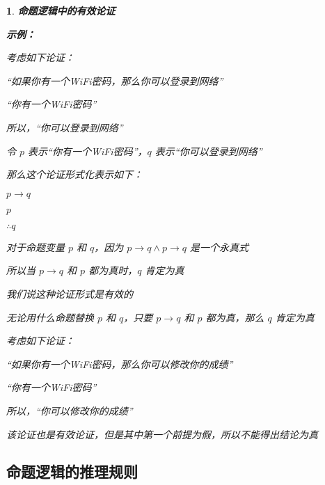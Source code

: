 \documentclass[UTF8]{report}
\theoremstyle{MyLineTheoremStyle} %
\theoremstyle{MyBlockTheoremStyle} %
\theoremstyle{MySubsubsectionStyle} %
\newtheorem{definition}{}
\begin{document}
\begin{definition}
    \textbf{命题逻辑中的有效论证}\par
    \vspace{1em} %
    \textbf{示例：}\par
    考虑如下论证：\par
    “如果你有一个WiFi密码，那么你可以登录到网络”\par
    “你有一个WiFi密码”\par
    所以，“你可以登录到网络”\par
    \vspace{1em} %
    令 $p$ 表示“你有一个WiFi密码”，$q$ 表示“你可以登录到网络”\par
    那么这个论证形式化表示如下：\par
    $p \rightarrow q$\par
    $p$\par
    $\therefore q$\par
    \vspace{1em} %
    对于命题变量 $p$ 和 $q$，因为 $p \rightarrow q \land p \rightarrow q$ 是一个永真式\par
    所以当 $p \rightarrow q$ 和 $p$ 都为真时，$q$ 肯定为真\par
    我们说这种论证形式是有效的\par
    无论用什么命题替换 $p$ 和 $q$，只要 $p \rightarrow q$ 和 $p$ 都为真，那么 $q$ 肯定为真\par
\vspace{1em} %
    考虑如下论证：\par
    “如果你有一个WiFi密码，那么你可以修改你的成绩”\par
    “你有一个WiFi密码”\par
    所以，“你可以修改你的成绩”\par
    该论证也是有效论证，但是其中第一个前提为假，所以不能得出结论为真\par
\end{definition}

\subsection{命题逻辑的推理规则}
\end{document}
